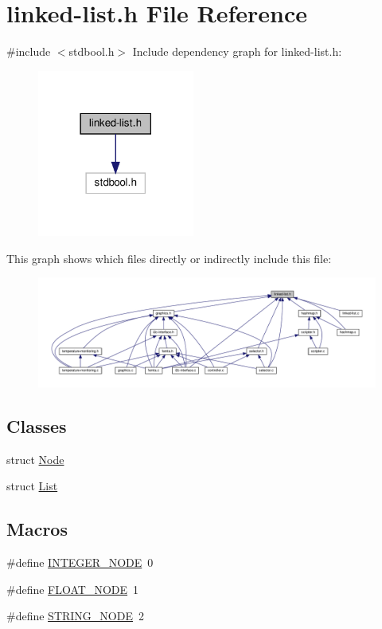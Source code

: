 \hypertarget{linked-list_8h}{}\section{linked-\/list.h File Reference}
\label{linked-list_8h}
{\ttfamily \#include $<$stdbool.\+h$>$}\newline
Include dependency graph for linked-\/list.h\+:\nopagebreak
\begin{figure}[H]
\begin{center}
\leavevmode
\includegraphics[width=146pt]{linked-list_8h__incl}
\end{center}
\end{figure}
This graph shows which files directly or indirectly include this file\+:
\nopagebreak
\begin{figure}[H]
\begin{center}
\leavevmode
\includegraphics[width=350pt]{linked-list_8h__dep__incl}
\end{center}
\end{figure}
\subsection*{Classes}
\begin{DoxyCompactItemize}
\item 
struct \hyperlink{structNode}{Node}
\item 
struct \hyperlink{structList}{List}
\end{DoxyCompactItemize}
\subsection*{Macros}
\begin{DoxyCompactItemize}
\item 
\#define \hyperlink{linked-list_8h_a38009bdae1680b572de252ce6efc72e3}{I\+N\+T\+E\+G\+E\+R\+\_\+\+N\+O\+DE}~0
\item 
\#define \hyperlink{linked-list_8h_ac7657356b9d25f27a814e9e5d7ae3d72}{F\+L\+O\+A\+T\+\_\+\+N\+O\+DE}~1
\item 
\#define \hyperlink{linked-list_8h_a6b6ad317b09a9ef8f68619bf862289d6}{S\+T\+R\+I\+N\+G\+\_\+\+N\+O\+DE}~2
\end{DoxyCompactItemize}
